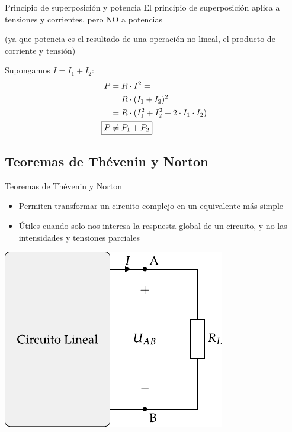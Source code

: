 \documentclass[aspectratio=169, xcolor={usenames,svgnames,dvipsnames}]{beamer}
\begin{document}
\begin{frame}{Principio de superposición y potencia}
    El principio de superposición aplica a tensiones y corrientes, pero \alert{NO a potencias}
    
    (ya que potencia es el resultado de una \alert{operación no lineal}, el producto de corriente y tensión)
    
    \vspace{5mm}
    
    Supongamos \(I = I_1 + I_2\):
    \begin{align*}
      P &= R \cdot I^2 =\\
           &= R \cdot (I_1 + I_2)^2 =\\
           &=R \cdot (I_1^2 + I_2^2 + 2\cdot I_1 \cdot I_2)\\
      \Aboxed{P &\neq P_1 + P_2}
    \end{align*}
\end{frame}




\subsection{Teoremas de Thévenin y Norton}

\begin{frame}{Teoremas de Thévenin y Norton}
    \begin{itemize}
        \item Permiten transformar un circuito complejo en un equivalente \alert{más simple}
        \item Útiles cuando solo nos interesa la \alert{respuesta global de un circuito}, y no las intensidades y tensiones parciales        
    \end{itemize}
    
    \begin{center}
    \includegraphics[width=.4\linewidth]{../figs/thevenin_continua_red.pdf}
    \end{center}
\end{frame}
\end{document}
